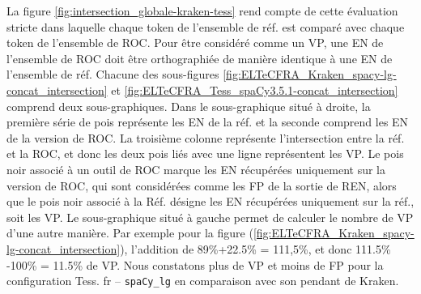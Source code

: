 La figure \ref{fig:intersection_globale-kraken-tess} rend compte de cette évaluation stricte dans laquelle chaque token de l'ensemble de réf. est comparé avec chaque token de l'ensemble de ROC. Pour être considéré comme un VP, une EN de l'ensemble de ROC doit être orthographiée de manière identique à une EN de l'ensemble de réf. Chacune des sous-figures \ref{fig:ELTeCFRA_Kraken_spacy-lg-concat_intersection} et \ref{fig:ELTeCFRA_Tess_spaCy3.5.1-concat_intersection} comprend deux sous-graphiques. Dans le sous-graphique situé à droite, la première série de pois représente les EN de la réf. et la seconde comprend les EN de la version de ROC. La troisième colonne représente l'intersection entre la réf. et la ROC, et donc les deux pois liés avec une ligne représentent les VP. Le pois noir associé à un outil de ROC marque les EN récupérées uniquement sur la version de ROC, qui sont considérées comme les FP de la sortie de REN, alors que le pois noir associé à la Réf. désigne les EN récupérées uniquement sur la réf., soit les VP. Le sous-graphique situé à gauche permet de calculer le nombre de VP d'une autre manière. Par exemple pour la figure (\ref{fig:ELTeCFRA_Kraken_spacy-lg-concat_intersection}), l'addition de 89\%+22.5\% = 111,5\%, et donc 111.5\% -100\% = 11.5\% de VP. Nous constatons plus de VP et moins de FP pour la configuration Tess. fr -- \texttt{spaCy\_lg} en comparaison avec son pendant de Kraken.

